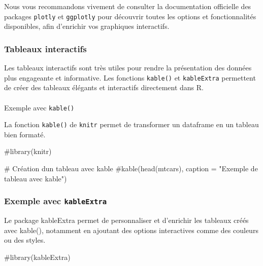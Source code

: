 \documentclass[
  letterpaper,
  DIV=11,
  numbers=noendperiod]{scrreprt}
\makeatletter
\let\oldparagraph\paragraph
\renewcommand{\paragraph}{
    \@ifstar
      \xxxParagraphStar
      \xxxParagraphNoStar
  }
\newcommand{\xxxParagraphStar}[1]{\oldparagraph*{#1}\mbox{}}
\newcommand{\xxxParagraphNoStar}[1]{\oldparagraph{#1}\mbox{}}
\newenvironment{Shaded}{\begin{snugshade}}{\end{snugshade}}
\newcommand{\CommentTok}[1]{\textcolor[rgb]{0.37,0.37,0.37}{#1}}
\makeatother
\begin{document}
Nous vous recommandons vivement de consulter la documentation officielle
des packages \texttt{plotly} et \texttt{ggplotly} pour découvrir toutes
les options et fonctionnalités disponibles, afin d'enrichir vos
graphiques interactifs.

\subsubsection{Tableaux interactifs}\label{tableaux-interactifs}

Les tableaux interactifs sont très utiles pour rendre la présentation
des données plus engageante et informative. Les fonctions
\texttt{kable()} et \texttt{kableExtra} permettent de créer des tableaux
élégants et interactifs directement dans R.

\paragraph{\texorpdfstring{Exemple avec
\texttt{kable()}}{Exemple avec kable()}}\label{exemple-avec-kable}

La fonction \texttt{kable()} de \texttt{knitr} permet de transformer un
dataframe en un tableau bien formaté.

\begin{Shaded}
\begin{Highlighting}[]
\CommentTok{\#library(knitr)}

\CommentTok{\# Création d\textquotesingle{}un tableau avec kable}
\CommentTok{\#kable(head(mtcars), caption = "Exemple de tableau avec kable")}
\end{Highlighting}
\end{Shaded}

\subsubsection{\texorpdfstring{Exemple avec
\texttt{kableExtra}}{Exemple avec kableExtra}}\label{exemple-avec-kableextra}

Le package kableExtra permet de personnaliser et d'enrichir les tableaux
créés avec kable(), notamment en ajoutant des options interactives comme
des couleurs ou des styles.

\begin{Shaded}
\begin{Highlighting}[]
\CommentTok{\#library(kableExtra)}
\end{Highlighting}
\end{Shaded}
\end{document}
